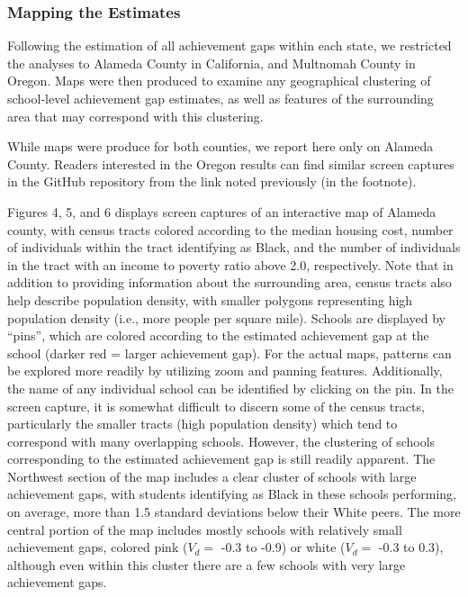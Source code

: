 \documentclass[man, fleqn, noextraspace]{apa6}
\theoremstyle{definition}
\theoremstyle{definition}
\theoremstyle{definition}
\theoremstyle{remark}
\begin{document}
\hypertarget{mapping-the-estimates}{%
\subsubsection{Mapping the Estimates}\label{mapping-the-estimates}}

Following the estimation of all achievement gaps within each state, we
restricted the analyses to Alameda County in California, and Multnomah
County in Oregon. Maps were then produced to examine any geographical
clustering of school-level achievement gap estimates, as well as
features of the surrounding area that may correspond with this
clustering.

While maps were produce for both counties, we report here only on
Alameda County. Readers interested in the Oregon results can find
similar screen captures in the GitHub repository from the link noted
previously (in the footnote).

Figures 4, 5, and 6 displays screen captures of an interactive map of
Alameda county, with census tracts colored according to the median
housing cost, number of individuals within the tract identifying as
Black, and the number of individuals in the tract with an income to
poverty ratio above 2.0, respectively. Note that in addition to
providing information about the surrounding area, census tracts also
help describe population density, with smaller polygons representing
high population density (i.e., more people per square mile). Schools are
displayed by \enquote{pins}, which are colored according to the
estimated achievement gap at the school (darker red = larger achievement
gap). For the actual maps, patterns can be explored more readily by
utilizing zoom and panning features. Additionally, the name of any
individual school can be identified by clicking on the pin. In the
screen capture, it is somewhat difficult to discern some of the census
tracts, particularly the smaller tracts (high population density) which
tend to correspond with many overlapping schools. However, the
clustering of schools corresponding to the estimated achievement gap is
still readily apparent. The Northwest section of the map includes a
clear cluster of schools with large achievement gaps, with students
identifying as Black in these schools performing, on average, more than
1.5 standard deviations below their White peers. The more central
portion of the map includes mostly schools with relatively small
achievement gaps, colored pink (\(V_d =\) -0.3 to -0.9) or white
(\(V_d =\) -0.3 to 0.3), although even within this cluster there are a
few schools with very large achievement gaps.
\end{document}
